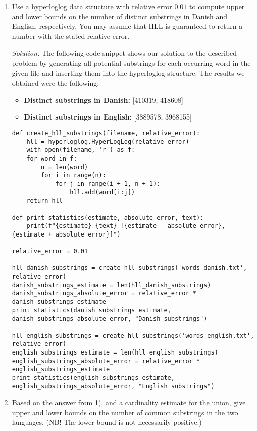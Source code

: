 \documentclass{article}
\begin{document}
\begin{enumerate}
    \item Use a hyperloglog data structure with relative error $0.01$ to compute upper and lower bounds on the number of distinct substrings in Danish and English, respectively. You may assume that HLL is guaranteed to return a number with the stated relative error.

    \emph{Solution.} The following code snippet shows our solution to the described problem by generating all potential substrings for each occurring word in the given file and inserting them into the hyperloglog structure. The results we obtained were the following:
    \begin{itemize}
        \item \textbf{Distinct substrings in Danish:} [410319, 418608]
        \item \textbf{Distinct substrings in English:} [3889578, 3968155]
    \end{itemize}

    \begin{lstlisting}
def create_hll_substrings(filename, relative_error):
    hll = hyperloglog.HyperLogLog(relative_error)
    with open(filename, 'r') as f:
    for word in f:
        n = len(word)
        for i in range(n):
            for j in range(i + 1, n + 1):
                hll.add(word[i:j])
    return hll
    
def print_statistics(estimate, absolute_error, text):
    print(f"{estimate} {text} [{estimate - absolute_error}, {estimate + absolute_error}]")

relative_error = 0.01

hll_danish_substrings = create_hll_substrings('words_danish.txt', relative_error)
danish_substrings_estimate = len(hll_danish_substrings)
danish_substrings_absolute_error = relative_error * danish_substrings_estimate
print_statistics(danish_substrings_estimate, danish_substrings_absolute_error, "Danish substrings")

hll_english_substrings = create_hll_substrings('words_english.txt', relative_error)
english_substrings_estimate = len(hll_english_substrings)
english_substrings_absolute_error = relative_error * english_substrings_estimate
print_statistics(english_substrings_estimate, english_substrings_absolute_error, "English substrings")
\end{lstlisting}
    
    
    \item Based on the answer from 1), and a cardinality estimate for the union, give upper and lower bounds on the number of common substrings in the two languages. (NB! The lower bound is not necessarily positive.)


\end{enumerate}
\end{document}

